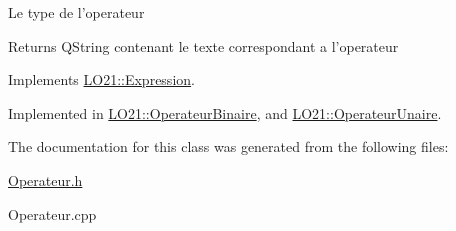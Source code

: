 \-Le type de l'operateur

\begin{DoxyReturn}{\-Returns}
\-Q\-String contenant le texte correspondant a l'operateur 
\end{DoxyReturn}


\-Implements \hyperlink{class_l_o21_1_1_expression}{\-L\-O21\-::\-Expression}.



\-Implemented in \hyperlink{class_l_o21_1_1_operateur_binaire_a7a25e004beb162f80873002759b4310e}{\-L\-O21\-::\-Operateur\-Binaire}, and \hyperlink{class_l_o21_1_1_operateur_unaire_a5b54c985de0fc559337f914771779185}{\-L\-O21\-::\-Operateur\-Unaire}.



\-The documentation for this class was generated from the following files\-:\begin{DoxyCompactItemize}
\item 
\hyperlink{_operateur_8h}{\-Operateur.\-h}\item 
\-Operateur.\-cpp\end{DoxyCompactItemize}
